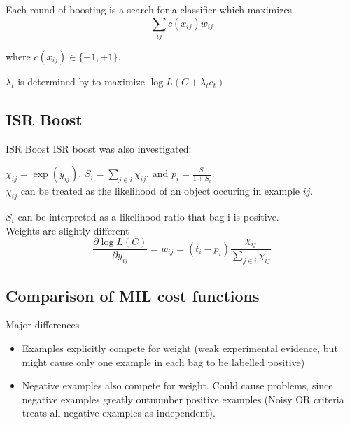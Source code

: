 \documentclass{beamer}
\begin{document}
	
	\begin{frame}{}

			Each round of boosting is a search for a classifier which maximizes 
			\[\sum_{ij} c(x_{ij})w_{ij}\]

			where \(c(x_{ij}) \in \{-1, +1\}\).
			

			\(\lambda_t\) is determined by to maximize \(\operatorname{log} L(C + \lambda_tc_t)\)

	\end{frame}

	\subsection{ISR Boost}

	\begin{frame}{ISR Boost}
			ISR boost was also investigated:

			\(\chi_{ij} = \operatorname{exp}(y_{ij})\), \(S_i = \sum_{j \in i}{\chi_{ij}}\), and \(p_i = \frac{S_i}{1 + S_i}\). \\

			$\chi_{ij}$ can be treated as the likelihood of an object occuring in example $ij$.

			$S_i$ can be interpreted as a likelihood ratio that bag i is positive. \\

			Weights are slightly different
			\[ \frac{\partial \operatorname{log} L(C)}{\partial y_{ij}} = w_{ij} = (t_i - p_i)\frac{\chi_{ij}}{\sum_{j \in i}{\chi_{ij}}} \]
	\end{frame}


	\subsection{Comparison of MIL cost functions}

	\begin{frame}{Major differences}
		\begin{center}

			\begin{itemize}
				\item Examples explicitly compete for weight (weak experimental evidence, but might cause only one example in each bag to be labelled positive)

				\item Negative examples also compete for weight. Could cause problems, since negative examples greatly outnumber positive examples
				(Noisy OR criteria treats all negative examples as independent).

			\end{itemize}
		\end{center}
	\end{frame}
\end{document}
